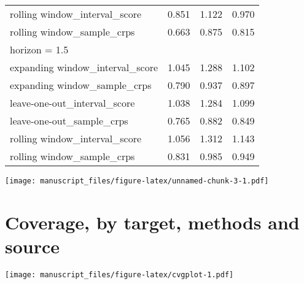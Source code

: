 \documentclass[
]{article}
\begin{document}
\begin{longtable}{l|rrr}
rolling window\_interval\_score & 0.851 & 1.122 & 0.970 \\ 
rolling window\_sample\_crps & 0.663 & 0.875 & 0.815 \\ 
\midrule
\multicolumn{4}{l}{horizon = 1.5} \\ 
\midrule
expanding window\_interval\_score & 1.045 & 1.288 & 1.102 \\ 
expanding window\_sample\_crps & 0.790 & 0.937 & 0.897 \\ 
leave-one-out\_interval\_score & 1.038 & 1.284 & 1.099 \\ 
leave-one-out\_sample\_crps & 0.765 & 0.882 & 0.849 \\ 
rolling window\_interval\_score & 1.056 & 1.312 & 1.143 \\ 
rolling window\_sample\_crps & 0.831 & 0.985 & 0.949 \\ 
\bottomrule
\end{longtable}

\texttt{[image: manuscript\_files/figure-latex/unnamed-chunk-3-1.pdf]}

\hypertarget{coverage-by-target-methods-and-source}{%
\section{Coverage, by target, methods and source}\label{coverage-by-target-methods-and-source}}

\texttt{[image: manuscript\_files/figure-latex/cvgplot-1.pdf]}
\end{document}
